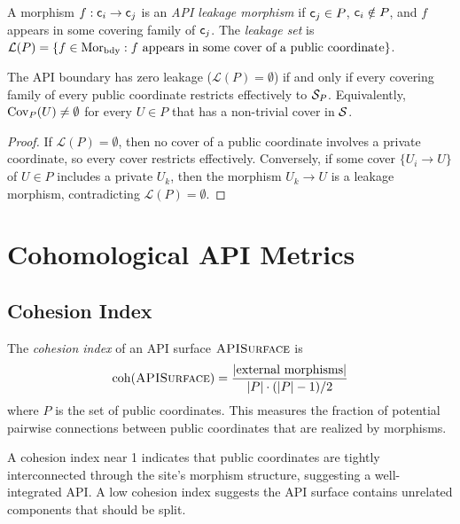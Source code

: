 \documentclass[11pt]{article}
\newcommand{\APISurface}{\textsc{APISurface}}
\newcommand{\CohIndex}{\mathrm{coh}}
\begin{document}
\begin{definition}\label{def:leakage}
A morphism $f : \mathsf{c}_i \to \mathsf{c}_j$ is an \emph{API leakage morphism}
if $\mathsf{c}_j \in P$, $\mathsf{c}_i \notin P$, and $f$ appears in some
covering family of $\mathsf{c}_j$.  The \emph{leakage set} is
$\mathcal{L}(P) = \{f \in \mathrm{Mor}_{\mathrm{bdy}} : f \text{ appears in some
cover of a public coordinate}\}$.
\end{definition}

\begin{proposition}\label{prop:zero-leak}
The API boundary has zero leakage ($\mathcal{L}(P) = \emptyset$) if and
only if every covering family of every public coordinate restricts
effectively to $\mathcal{S}_P$.  Equivalently, $\mathrm{Cov}_P(U) \neq \emptyset$ for
every $U \in P$ that has a non-trivial cover in $\mathcal{S}$.
\end{proposition}

\begin{proof}
If $\mathcal{L}(P) = \emptyset$, then no cover of a public coordinate
involves a private coordinate, so every cover restricts effectively.
Conversely, if some cover $\{U_i \to U\}$ of $U \in P$ includes a
private $U_k$, then the morphism $U_k \to U$ is a leakage morphism,
contradicting $\mathcal{L}(P) = \emptyset$.
\end{proof}

\section{Cohomological API Metrics}\label{sec:metrics}

\subsection{Cohesion Index}

\begin{definition}\label{def:cohesion}
The \emph{cohesion index} of an API surface $\APISurface$ is
\[
  \CohIndex(\APISurface) = \frac{|\text{external morphisms}|}{|P| \cdot (|P| - 1) / 2}
\]
where $P$ is the set of public coordinates.  This measures the fraction
of potential pairwise connections between public coordinates that are
realized by morphisms.
\end{definition}

A cohesion index near 1 indicates that public coordinates are tightly
interconnected through the site's morphism structure, suggesting a
well-integrated API.  A low cohesion index suggests the API surface
contains unrelated components that should be split.
\end{document}
